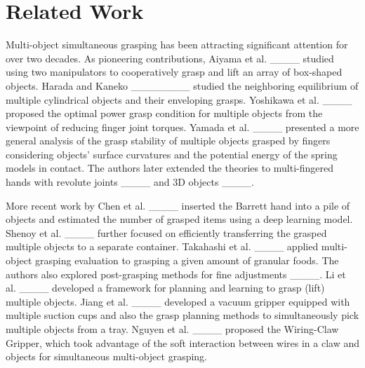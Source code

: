\section{Related Work}

Multi-object simultaneous grasping has been attracting significant attention for over two decades. As pioneering contributions, Aiyama et al. ____ studied using two manipulators to cooperatively grasp and lift an array of box-shaped objects. Harada and Kaneko ________ studied the neighboring equilibrium of multiple cylindrical objects and their enveloping grasps. Yoshikawa et al. ____ proposed the optimal power grasp condition for multiple objects from the viewpoint of reducing finger joint torques. Yamada et al. ____ presented a more general analysis of the grasp stability of multiple objects grasped by fingers considering objects' surface curvatures and the potential energy of the spring models in contact. The authors later extended the theories to multi-fingered hands with revolute joints ____ and 3D objects ____. 

More recent work by Chen et al. ____ inserted the Barrett hand into a pile of objects and estimated the number of grasped items using a deep learning model. Shenoy et al. ____ further focused on efficiently transferring the grasped multiple objects to a separate container. Takahashi et al. ____ applied multi-object grasping evaluation to grasping a given amount of granular foods. The authors also explored post-grasping methods for fine adjustments ____. Li et al. ____ developed a framework for planning and learning to grasp (lift) multiple objects. Jiang et al. ____ developed a vacuum gripper equipped with multiple suction cups and also the grasp planning methods to simultaneously pick multiple objects from a tray. Nguyen et al. ____ proposed the Wiring-Claw Gripper, which took advantage of the soft interaction between wires in a claw and objects for simultaneous multi-object grasping.

